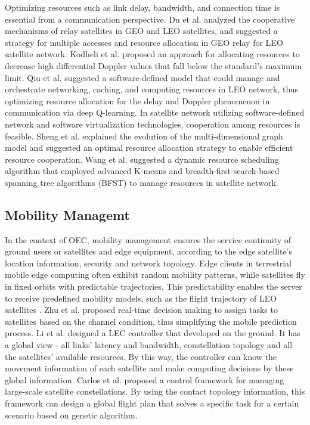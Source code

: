 \documentclass[lettersize,journal]{IEEEtran}
\begin{document}
Optimizing resources such as link delay, bandwidth, and connection time is essential from a communication perspective. Du et al. \cite{RN248} analyzed the cooperative mechanisms of relay satellites in GEO and LEO satellites, and suggested a strategy for multiple accesses and resource allocation in GEO relay for LEO satellite network. Kodheli et al. \cite{RN249} proposed an approach for allocating resources to decrease high differential Doppler values that fall below the standard's maximum limit. Qiu et al. \cite{RN247} suggested a software-defined model that could manage and orchestrate networking, caching, and computing resources in LEO network, thus optimizing resource allocation for the delay and Doppler phenomenon in communication via deep Q-learning. In satellite network utilizing software-defined network and software virtualization technologies, cooperation among resources is feasible. Sheng et al. \cite{RN250} explained the evolution of the multi-dimensional graph model and suggested an optimal resource allocation strategy to enable efficient resource cooperation. Wang et al. \cite{RN246} suggested a dynamic resource scheduling algorithm that employed advanced K-means and breadth-first-search-based spanning tree algorithms (BFST) to manage resources in satellite network.

\subsection{Mobility Managemt}
In the context of OEC, mobility management ensures the service continuity of ground users or satellites and edge equipment, according to the edge satellite's location information, security and network topology. Edge clients in terrestrial mobile edge computing often exhibit random mobility patterns, while satellites fly in fixed orbits with predictable trajectories. This predictability enables the server to receive predefined mobility models, such as the flight trajectory of LEO satellites \cite{RN243}. Zhu et al. \cite{RN79} proposed real-time decision making to assign tasks to satellites based on the channel condition, thus simplifying the mobile prediction process. Li et al. \cite{RN55} designed a LEC controller that developed on the ground. It has a global view - all links' latency and bandwidth, constellation topology and all the satellites' available resources. By this way, the controller can know the movement information of each satellite and make computing decisions by these global information. Carlos et al. \cite{RN240} proposed a control framework for managing large-scale satellite constellations. By using the contact topology information, this framework can design a global flight plan that solves a specific task for a certain scenario based on genetic algorithm. 
\end{document}
